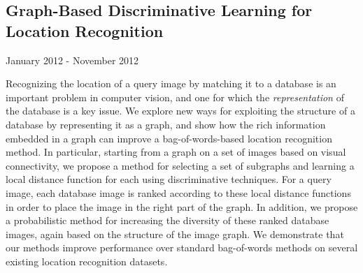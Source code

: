 \documentclass[10pt,letterpaper]{article}
\renewenvironment{itemize}{
  \begin{list}{}{
    \setlength{\leftmargin}{1.5em}
    \setlength{\itemsep}{0.25em}
    \setlength{\parskip}{0pt}
    \setlength{\parsep}{0.25em}
  }
}{
  \end{list}
}
\begin{document}
\subsection*{Graph-Based Discriminative Learning for Location Recognition}
\begin{itemize}
\item January 2012 - November 2012
\item Recognizing the location of a query image by matching it to a database is an important problem in computer vision, and one for which the {\em  representation} of the database is a key issue.  We explore new ways for exploiting the structure of a database by representing it as a graph, and show how the rich information embedded in a graph can improve a bag-of-words-based location recognition method.  In particular, starting from a graph on a set of images based on visual connectivity, we propose a method for selecting a set of subgraphs and learning a local distance function for each using discriminative techniques.  For a query image, each database image is ranked according to these local distance functions in order to place the image in the right part of the graph.  In addition, we propose a probabilistic method for increasing the diversity of these ranked database images, again based on the structure of the image graph.  We demonstrate that our methods improve performance over standard bag-of-words methods on several existing location recognition datasets.
\end{itemize}
\end{document}
